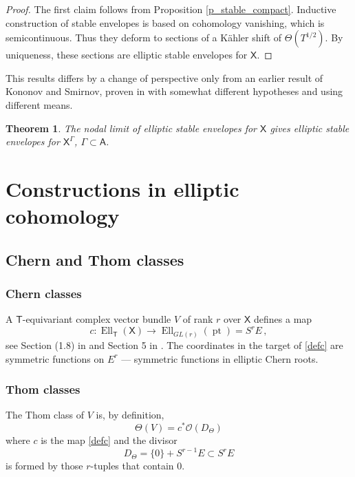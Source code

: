 \documentclass[14pt]{extarticle}
\newcommand{\bT}{\mathsf{T}}
\newcommand{\bA}{\mathsf{A}}
\newcommand{\bX}{\mathsf{X}}
\newcommand{\cO}{\mathscr{O}}
\DeclareMathOperator{\Ell}{Ell}
\DeclareMathOperator{\pt}{pt}
\newtheorem{Theorem}{Theorem}
\theoremstyle{definition}
\begin{document}
  \begin{proof}
    The first claim follows from Proposition
    \ref{p_stable_compact}. Inductive construction of stable envelopes
    is based on cohomology vanishing, which is semicontinuous. Thus they
    deform to sections of  a K\"ahler shift of $\Theta(T^{1/2})$. By
    uniqueness, these sections are elliptic stable envelopes for
    $\bX$. 
  \end{proof}

  This results differs by a change of perspective only from an earlier
  result of Kononov and Smirnov, proven in \cite{KonSmi} with somewhat different
  hypotheses and using different means.

  \begin{Theorem}{\cite{KonSmi}} The nodal limit of elliptic stable envelopes for
    $\bX$ gives elliptic stable envelopes for $\bX^\Gamma$, $\Gamma
    \subset \bA$. 
  \end{Theorem}

  \appendix

  \section{Constructions in elliptic cohomology}\label{s_constr} 



 \subsection{Chern and Thom classes} 

\subsubsection{Chern classes}


A $\bT$-equivariant  complex vector bundle $V$ of rank $r$ over $\bX$ defines a map
%
\begin{equation}
c: \Ell_\bT(\bX) \to \Ell_{GL(r)}(\pt) = S^r E \,, \label{defc}
\end{equation}
%
see Section (1.8) in \cite{GKV} and Section 5 in \cite{Ganter}. 
The coordinates in the target of \eqref{defc} are 
symmetric functions on $E^r$ --- symmetric functions in elliptic 
Chern roots. 


\subsubsection{Thom classes}

The Thom class of $V$ is, by definition, 
$$
\Theta(V) = c^* \cO(D_\Theta) 
$$
where $c$ is the map \eqref{defc} and 
the divisor 
%
\begin{equation}
D_\Theta = \{0\} + S^{r-1} E \subset  S^{r} E\label{DTh}
\end{equation}
%
is 
formed by those $r$-tuples that contain $0$.
\end{document}

